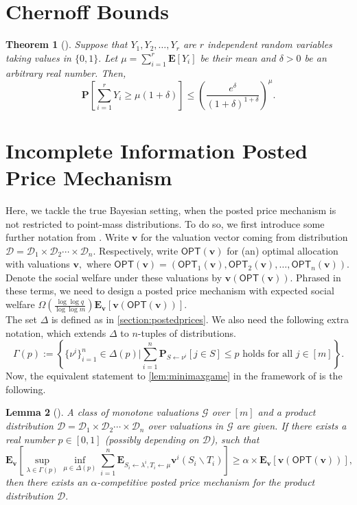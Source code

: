 \documentclass[11pt]{article}\usepackage{amsfonts}
\newtheorem{theorem}{Theorem}
\newtheorem{lemma}[theorem]{Lemma}
\numberwithin{theorem}{subsection}
\newcommand{\prob}{\mathbf{P}}
\newcommand{\boldv}{\mathbf{v}}
\newcommand{\opt}{\mathsf{OPT}}
\newcommand{\expect}{\mathbf{E}}
\begin{document}
\section{Chernoff Bounds}
\begin{theorem}[{\cite[Theorem 4.4]{Mitzenmacher05}}]
\label{thm:chernoff}
Suppose that $Y_1, Y_2, \ldots, Y_r$ are $r$ independent random variables taking values in $\{0,1\}.$ Let $\mu = \sum_{i=1}^r \expect[Y_i]$ be their mean and $\delta>0$ be an arbitrary real number. Then,
$$
\prob\left[\sum_{i = 1}^r Y_i \ge \mu(1 + \delta)\right]
\le 
\left(
\frac{e^\delta}{(1+\delta)^{1+\delta}}
\right)^{\mu}.
$$
\end{theorem}

\section{Incomplete Information Posted Price Mechanism}\label{sec:incompleteposted}
Here, we tackle the true Bayesian setting, when the posted price mechanism is not restricted to point-mass distributions. To do so, we first introduce some further notation from \cite{DuttingKL20}. Write $\boldv$ for the valuation vector coming from distribution $\mathcal{D} = \mathcal{D}_1\times \mathcal{D}_2\cdots\times\mathcal{D}_n.$ Respectively, write $\opt(\boldv)$ for (an) optimal allocation with valuations $\boldv,$ where $\opt(\boldv) =  (\opt_1(\boldv),\opt_2(\boldv),\ldots, \opt_n(\boldv)).$ Denote the social welfare under these valuations by $\boldv(\opt(\boldv)).$ Phrased in these terms, we need to design a posted price mechanism with expected social welfare $\Omega\left(\frac{\log \log q}{\log \log m}\right)\expect_\boldv[\boldv(\opt(\boldv))].$\\

\noindent
The set $\Delta$ is defined as in \cref{section:postedprices}. We also need the following extra notation, which extends $\Delta$ to $n$-tuples of distributions.
$$
\Gamma(p):=
\left\{\{\nu^i\}_{i=1}^n \in \Delta(p)| \sum_{i=1}^n 
\prob_{S\longleftarrow \nu^i}[j \in S]\le p \text{ holds for all }j \in [m]\right\}.
$$
Now, the equivalent statement to 
\cref{lem:minimaxgame} in the framework of 
\cite{DuttingKL20}
is the following.

\begin{lemma}[{\cite[p.268]{DuttingKL20}}]
\label{lem:minimaxgamebayes}
A class of monotone valuations $\mathcal{G}$ over $[m]$ and a product distribution 
$\mathcal{D} = \mathcal{D}_1\times \mathcal{D}_2\cdots\times\mathcal{D}_n$ over valuations in $\mathcal{G}$ are given.
If there exists a real number $p \in [0,1]$ (possibly depending on $\mathcal{D}$), such that 
$$
\expect_{\boldv}\left[
\sup_{\lambda \in \Gamma(p)}
\inf_{\mu \in \Delta(p)}
\sum_{i = 1}^n 
\expect_{S_i\longleftarrow \lambda^i, T_i \longleftarrow \mu}\boldv^i(S_i\backslash T_i)
\right]\ge 
\alpha\times \expect_\boldv[\boldv(\opt(\boldv))],
$$
then there exists an $\alpha$-competitive posted price mechanism for the product distribution $\mathcal{D}.$
\end{lemma}
\end{document}
